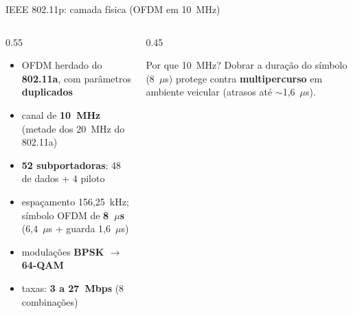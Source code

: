 \documentclass[aspectratio=169,11pt]{beamer}
\begin{document}
\begin{frame}{IEEE 802.11p: camada física (OFDM em 10~MHz)}
  \begin{columns}
    \begin{column}{0.55\textwidth}
      \begin{itemize}
        \item OFDM herdado do \textbf{802.11a}, com parâmetros \textbf{duplicados}
        \item canal de \textbf{10~MHz} (metade dos 20~MHz do 802.11a)
        \item \textbf{52 subportadoras}: 48 de dados + 4 piloto
        \item espaçamento 156,25~kHz; símbolo OFDM de \textbf{8~$\mu$s} (6,4~$\mu$s + guarda 1,6~$\mu$s)
        \item modulações \textbf{BPSK $\rightarrow$ 64-QAM}
        \item taxas: \textbf{3 a 27~Mbps} (8 combinações)
      \end{itemize}
    \end{column}
    \begin{column}{0.45\textwidth}
      \begin{center}
      \end{center}
      \begin{block}{Por que 10~MHz?}
        Dobrar a duração do símbolo (8~$\mu$s) protege contra \textbf{multipercurso} em ambiente veicular (atrasos até $\sim$1,6~$\mu$s).
      \end{block}
    \end{column}
  \end{columns}
\end{frame}
\end{document}
